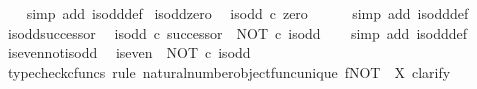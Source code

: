 \begin{isabellebody}
%
\isadelimproof
\ \ %
\endisadelimproof
%
\isatagproof
{}\isamarkupfalse%
\ {\isacharparenleft}{\kern0pt}simp\ add{\isacharcolon}{\kern0pt}\ is{\isacharunderscore}{\kern0pt}odd{\isacharunderscore}{\kern0pt}def{}{\isacharparenright}{\kern0pt}%
\endisatagproof
{\isafoldproof}%
%
\isadelimproof
\isanewline
%
\endisadelimproof
\isanewline
{}\isamarkupfalse%
\ is{\isacharunderscore}{\kern0pt}odd{\isacharunderscore}{\kern0pt}zero{\isacharcolon}{\kern0pt}\isanewline
\ \ {\isachardoublequoteopen}is{\isacharunderscore}{\kern0pt}odd\ {\isasymcirc}\isactrlsub c\ zero\ {\isacharequal}{\kern0pt}\ {\isasymf}{\isachardoublequoteclose}\isanewline
%
\isadelimproof
\ \ %
\endisadelimproof
%
\isatagproof
{}\isamarkupfalse%
\ {\isacharparenleft}{\kern0pt}simp\ add{\isacharcolon}{\kern0pt}\ is{\isacharunderscore}{\kern0pt}odd{\isacharunderscore}{\kern0pt}def{}{\isacharparenright}{\kern0pt}%
\endisatagproof
{\isafoldproof}%
%
\isadelimproof
\isanewline
%
\endisadelimproof
\isanewline
{}\isamarkupfalse%
\ is{\isacharunderscore}{\kern0pt}odd{\isacharunderscore}{\kern0pt}successor{\isacharcolon}{\kern0pt}\isanewline
\ \ {\isachardoublequoteopen}is{\isacharunderscore}{\kern0pt}odd\ {\isasymcirc}\isactrlsub c\ successor\ {\isacharequal}{\kern0pt}\ NOT\ {\isasymcirc}\isactrlsub c\ is{\isacharunderscore}{\kern0pt}odd{\isachardoublequoteclose}\isanewline
%
\isadelimproof
\ \ %
\endisadelimproof
%
\isatagproof
{}\isamarkupfalse%
\ {\isacharparenleft}{\kern0pt}simp\ add{\isacharcolon}{\kern0pt}\ is{\isacharunderscore}{\kern0pt}odd{\isacharunderscore}{\kern0pt}def{}{\isacharparenright}{\kern0pt}%
\endisatagproof
{\isafoldproof}%
%
\isadelimproof
\isanewline
%
\endisadelimproof
\isanewline
{}\isamarkupfalse%
\ is{\isacharunderscore}{\kern0pt}even{\isacharunderscore}{\kern0pt}not{\isacharunderscore}{\kern0pt}is{\isacharunderscore}{\kern0pt}odd{\isacharcolon}{\kern0pt}\isanewline
\ \ {\isachardoublequoteopen}is{\isacharunderscore}{\kern0pt}even\ {\isacharequal}{\kern0pt}\ NOT\ {\isasymcirc}\isactrlsub c\ is{\isacharunderscore}{\kern0pt}odd{\isachardoublequoteclose}\isanewline
%
\isadelimproof
%
\endisadelimproof
%
\isatagproof
{}\isamarkupfalse%
\ {\isacharparenleft}{\kern0pt}typecheck{\isacharunderscore}{\kern0pt}cfuncs{\isacharcomma}{\kern0pt}\ rule\ natural{\isacharunderscore}{\kern0pt}number{\isacharunderscore}{\kern0pt}object{\isacharunderscore}{\kern0pt}func{\isacharunderscore}{\kern0pt}unique{\isacharbrackleft}{\kern0pt}\ f{\isacharequal}{\kern0pt}{\isachardoublequoteopen}NOT{\isachardoublequoteclose}{\isacharcomma}{\kern0pt}\ \ X{\isacharequal}{\kern0pt}{\isachardoublequoteopen}{\isasymOmega}{\isachardoublequoteclose}{\isacharbrackright}{\kern0pt}{\isacharcomma}{\kern0pt}\ clarify{\isacharparenright}{\kern0pt}\isanewline

\end{isabellebody}

